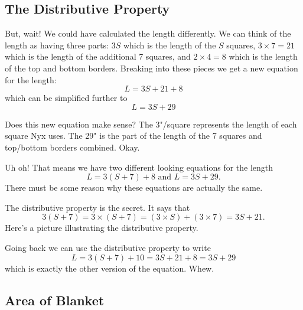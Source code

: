\subsection*{The Distributive Property}

But, wait!  We could have calculated the length differently.  We can think of the length as having three parts: $3S$ which is the length of the $S$ squares, $3 \times 7 = 21$ which is the length of the additional 7 squares, and $2 \times 4 = 8$ which is the length of the top and bottom borders.  Breaking into these pieces we get a new equation for the length:
$$L = 3S + 21 + 8$$
which can be simplified further to 
$$L = 3S + 29$$

Does this new equation make sense?  The 3"/square represents the length of each square Nyx uses.  The 29" is the part of the length of the 7 squares and top/bottom borders combined.  Okay.

Uh oh! That means we have two different looking equations for the length
$$L = 3(S+7)+8 \text{ and }
L=3S + 29.$$
There must be some reason why these equations are actually the same. 

The distributive property is the secret.  It says that 
 $$3(S+7)=3 \times (S+7) = (3 \times S) + (3 \times 7) = 3S + 21.$$  
 Here's a picture illustrating the distributive property.

 \begin{center}
 \end{center}
 
Going back we can use the distributive property to write $$L = 3(S+7) + 10 = 3S +21 + 8 = 3S + 29$$
which is exactly the other version of the equation.  Whew.   

\subsection*{Area of Blanket}

